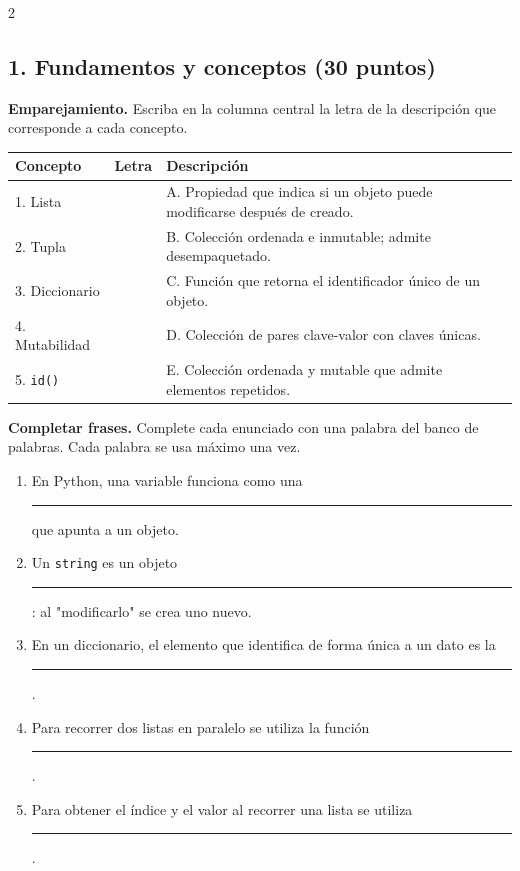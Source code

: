 \documentclass[addpoints,10pt]{exam}
\begin{document}
	\begin{multicols}{2}
		\begin{questions}
			\boxedpoints
			
			\section*{1. Fundamentos y conceptos (30 puntos)}
			
			\question[10]
			\textbf{Emparejamiento.} Escriba en la columna central la letra de la descripción que corresponde a cada concepto.
			
			\noindent
			\begin{center}
				\begin{tabular}{|l|c|p{4.6cm}|}
					\hline
					\textbf{Concepto} & \textbf{Letra} & \textbf{Descripción}\\ \hline
					1. Lista & & A. Propiedad que indica si un objeto puede modificarse después de creado.\\ \hline
					2. Tupla & & B. Colección ordenada e inmutable; admite desempaquetado.\\ \hline
					3. Diccionario & & C. Función que retorna el identificador único de un objeto.\\ \hline
					4. Mutabilidad & & D. Colección de pares clave-valor con claves únicas.\\ \hline
					5. \texttt{id()} & & E. Colección ordenada y mutable que admite elementos repetidos.\\ \hline
				\end{tabular}
			\end{center}
			
			\question[10]
			\textbf{Completar frases.} Complete cada enunciado con una palabra del banco de palabras. Cada palabra se usa máximo una vez.
			
			\begin{center}
			\end{center}
			
			\begin{enumerate}
				\item En Python, una variable funciona como una \rule{2cm}{0.4pt} que apunta a un objeto.
				\item Un \texttt{string} es un objeto \rule{2cm}{0.4pt}: al "modificarlo" se crea uno nuevo.
				\item En un diccionario, el elemento que identifica de forma única a un dato es la \rule{2cm}{0.4pt}.
				\item Para recorrer dos listas en paralelo se utiliza la función \rule{2cm}{0.4pt}.
				\item Para obtener el índice y el valor al recorrer una lista se utiliza \rule{2cm}{0.4pt}.
			\end{enumerate}
			

\end{questions}
\end{multicols}
\end{document}
